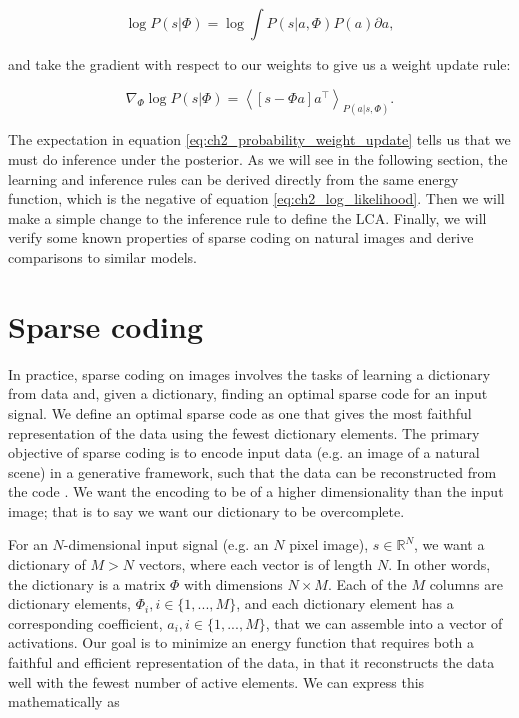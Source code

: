 \begin{equation}\label{eq:ch2_log_image_probability}
    \log{P(s|\Phi)} = \log{\int P(s|a,\Phi)P(a)\partial a},
\end{equation}

\noindent and take the gradient with respect to our weights to give us a weight update rule:

\begin{equation}\label{eq:ch2_probability_weight_update}
    \nabla_{\Phi} \log{P(s|\Phi)} = \left< \left[s - \Phi a\right]a^{\top}\right>_{P(a|s,\Phi)}.
\end{equation}

The expectation in equation \eqref{eq:ch2_probability_weight_update} tells us that we must do inference under the posterior. As we will see in the following section, the learning and inference rules can be derived directly from the same energy function, which is the negative of equation \eqref{eq:ch2_log_likelihood}. Then we will make a simple change to the inference rule to define the LCA. Finally, we will verify some known properties of sparse coding on natural images and derive comparisons to similar models.


\section{Sparse coding}
In practice, sparse coding on images involves the tasks of learning a dictionary from data and, given a dictionary, finding an optimal sparse code for an input signal. We define an optimal sparse code as one that gives the most faithful representation of the data using the fewest dictionary elements. The primary objective of sparse coding is to encode input data (e.g. an image of a natural scene) in a generative framework, such that the data can be reconstructed from the code \parencite{olshausen1997sparse}. We want the encoding to be of a higher dimensionality than the input image; that is to say we want our dictionary to be overcomplete.

For an $N$-dimensional input signal (e.g. an $N$ pixel image), $s \in \mathbb{R}^{N}$, we want a dictionary of $M > N$ vectors, where each vector is of length $N$. In other words, the dictionary is a matrix $\Phi$ with dimensions $N \times M$. Each of the $M$ columns are dictionary elements, $\Phi_{i}, i \in \{1,...,M\}$, and each dictionary element has a corresponding coefficient, $a_{i}, i \in \{1,...,M\}$, that we can assemble into a vector of activations. Our goal is to minimize an energy function that requires both a faithful and efficient representation of the data, in that it reconstructs the data well with the fewest number of active elements. We can express this mathematically as

